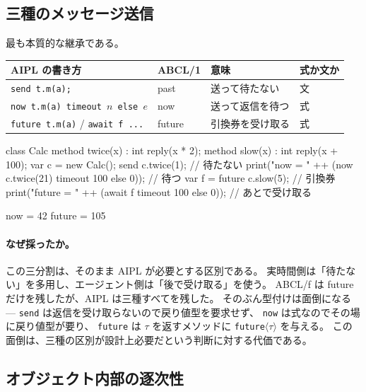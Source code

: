 \documentclass[11pt,a4paper]{ltjsarticle}
\theoremstyle{definition}
\theoremstyle{remark}
\begin{document}
\subsection{三種のメッセージ送信}

最も本質的な継承である。

\begin{center}
\begin{tabular}{llll}
\toprule
AIPL の書き方 & ABCL/1 & 意味 & 式か文か \\
\midrule
\texttt{send t.m(a);}                          & past   & 送って待たない & 文 \\
\texttt{now t.m(a) timeout $n$ else $e$}       & now    & 送って返信を待つ & 式 \\
\texttt{future t.m(a)} / \texttt{await f ...}  & future & 引換券を受け取る & 式 \\
\bottomrule
\end{tabular}
\end{center}

\begin{aipl}
class Calc {
  method twice(x) : int { reply(x * 2); }
  method slow(x)  : int { reply(x + 100); }
}
var c = new Calc();
send c.twice(1);                                            // 待たない
print("now    = " ++ (now c.twice(21) timeout 100 else 0)); // 待つ
var f = future c.slow(5);                                   // 引換券
print("future = " ++ (await f timeout 100 else 0));         // あとで受け取る
\end{aipl}
\begin{term}
now    = 42
future = 105
\end{term}

\paragraph{なぜ採ったか。}
この三分割は、そのまま AIPL が必要とする区別である。
実時間側は「待たない」を多用し、エージェント側は「後で受け取る」を使う。
ABCL/f は future だけを残したが、AIPL は三種すべてを残した。
そのぶん型付けは面倒になる --- \texttt{send} は返信を受け取らないので戻り値型を要求せず、
\texttt{now} は式なのでその場に戻り値型が要り、
\texttt{future} は $\tau$ を返すメソッドに \texttt{future}$\langle\tau\rangle$ を与える。
この面倒は、三種の区別が設計上必要だという判断に対する代価である。

\subsection{オブジェクト内部の逐次性}
\end{document}
